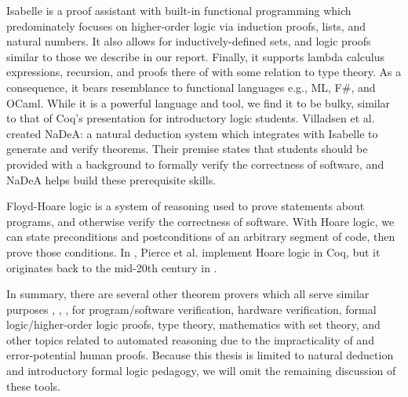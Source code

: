 \documentclass[ms]{uncgdissertationexp2}
\theoremstyle{plain}
\theoremstyle{definition}
\theoremstyle{remark}
\begin{document}
Isabelle \cite{isabelle} is a proof assistant with built-in functional programming which predominately focuses on higher-order logic via induction proofs, lists, and natural numbers. It also allows for inductively-defined sets, and logic proofs similar to those we describe in our report. Finally, it supports lambda calculus expressions, recursion, and proofs there of with some relation to type theory. As a consequence, it bears resemblance to functional languages e.g., ML, F\#, and OCaml. While it is a powerful language and tool, we find it to be bulky, similar to that of Coq's presentation for introductory logic students. Villadsen et al. \cite{villadsen} created NaDeA: a natural deduction system which integrates with Isabelle to generate and verify theorems. Their premise states that students should be provided with a background to formally verify the correctness of software, and NaDeA helps build these prerequisite skills.

Floyd-Hoare logic is a system of reasoning used to prove statements about programs, and otherwise verify the correctness of software. With Hoare logic, we can state preconditions and postconditions of an arbitrary segment of code, then prove those conditions. In \cite{softwarefoundations}, Pierce et al. implement Hoare logic in Coq, but it originates back to the mid-20th century in \cite{hoare}.

In summary, there are several other theorem provers which all serve similar purposes \cite{twelf}, \cite{acl2}, \cite{pvs}, \cite{alphaleantap} for program/software verification, hardware verification, formal logic/higher-order logic proofs, type theory, mathematics with set theory, and other topics related to automated reasoning due to the impracticality of and error-potential human proofs. Because this thesis is limited to natural deduction and introductory formal logic pedagogy, we will omit the remaining discussion of these tools.
\end{document}
